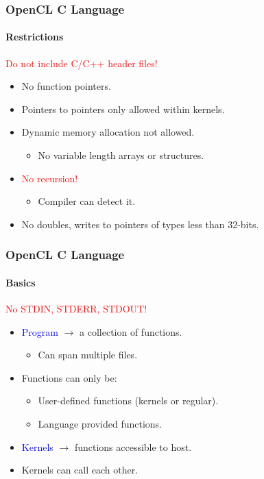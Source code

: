 \documentclass{beamer}
\begin{document}
\begin{frame}
\frametitle{OpenCL C Language}
\framesubtitle{Restrictions}

  \begin{center}
\textcolor{red}{Do not include C/C++ header files!}
  \end{center}
  
  \begin{itemize}
  \item No function pointers.
  \item Pointers to pointers only allowed within kernels.
  \item Dynamic memory allocation not allowed.
    \begin{itemize}
    \item No variable length arrays or structures.
    \end{itemize}
  \item \textcolor{red}{No recursion!}
    \begin{itemize}
    \item Compiler can detect it.
    \end{itemize}
  \item No doubles, writes to pointers of types less than 32-bits.
  \end{itemize}

\end{frame}

\begin{frame}
\frametitle{OpenCL C Language}
\framesubtitle{Basics}

  \begin{center}
\textcolor{red}{No STDIN, STDERR, STDOUT!}
  \end{center}
  
  \begin{itemize}
  \item \textcolor{blue}{Program} $\rightarrow{}$ a collection of functions.
    \begin{itemize}
    \item Can span multiple files.
    \end{itemize}
  \item Functions can only be:
    \begin{itemize}
    \item User-defined functions (kernels or regular).
    \item Language provided functions.
    \end{itemize}
  \item \textcolor{blue}{Kernels} $\rightarrow{}$ functions accessible to host.
  \item Kernels can call each other.
  \end{itemize}

\end{frame}
\end{document}
